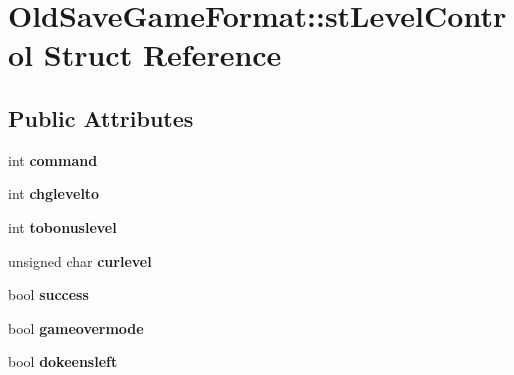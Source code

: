 \hypertarget{struct_old_save_game_format_1_1st_level_control}{
\section{OldSaveGameFormat::stLevelControl Struct Reference}
\label{struct_old_save_game_format_1_1st_level_control}
}
\subsection*{Public Attributes}
\begin{DoxyCompactItemize}
\item 
\hypertarget{struct_old_save_game_format_1_1st_level_control_a1fc0a1b10db8c7edf4ee852d774d85db}{
int {\bfseries command}}
\label{struct_old_save_game_format_1_1st_level_control_a1fc0a1b10db8c7edf4ee852d774d85db}

\item 
\hypertarget{struct_old_save_game_format_1_1st_level_control_aae96e4d1aa8bae03edf3965cf5a4f95d}{
int {\bfseries chglevelto}}
\label{struct_old_save_game_format_1_1st_level_control_aae96e4d1aa8bae03edf3965cf5a4f95d}

\item 
\hypertarget{struct_old_save_game_format_1_1st_level_control_ad03593d44c2bf17732ccb4e224869a96}{
int {\bfseries tobonuslevel}}
\label{struct_old_save_game_format_1_1st_level_control_ad03593d44c2bf17732ccb4e224869a96}

\item 
\hypertarget{struct_old_save_game_format_1_1st_level_control_aa1853f06d0b6784237b76dffb7824ec0}{
unsigned char {\bfseries curlevel}}
\label{struct_old_save_game_format_1_1st_level_control_aa1853f06d0b6784237b76dffb7824ec0}

\item 
\hypertarget{struct_old_save_game_format_1_1st_level_control_a7057ced7cbd003266b10afbe7f8658b5}{
bool {\bfseries success}}
\label{struct_old_save_game_format_1_1st_level_control_a7057ced7cbd003266b10afbe7f8658b5}

\item 
\hypertarget{struct_old_save_game_format_1_1st_level_control_aeea9e42b70fd62da6237c81db7aa131a}{
bool {\bfseries gameovermode}}
\label{struct_old_save_game_format_1_1st_level_control_aeea9e42b70fd62da6237c81db7aa131a}

\item 
\hypertarget{struct_old_save_game_format_1_1st_level_control_aaacf111f400ac09e9da10a5aa9e76c60}{
bool {\bfseries dokeensleft}}
\label{struct_old_save_game_format_1_1st_level_control_aaacf111f400ac09e9da10a5aa9e76c60}


\end{DoxyCompactItemize}
